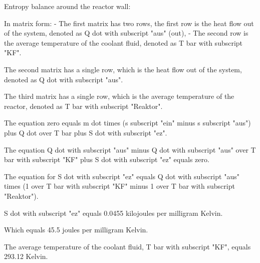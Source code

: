 Entropy balance around the reactor wall:

In matrix form:
- The first matrix has two rows, the first row is the heat flow out of the system, denoted as Q dot with subscript "aus" (out),
- The second row is the average temperature of the coolant fluid, denoted as T bar with subscript "KF".

The second matrix has a single row, which is the heat flow out of the system, denoted as Q dot with subscript "aus".

The third matrix has a single row, which is the average temperature of the reactor, denoted as T bar with subscript "Reaktor".

The equation zero equals m dot times (s subscript "ein" minus s subscript "aus") plus Q dot over T bar plus S dot with subscript "ez".

The equation Q dot with subscript "aus" minus Q dot with subscript "aus" over T bar with subscript "KF" plus S dot with subscript "ez" equals zero.

The equation for S dot with subscript "ez" equals Q dot with subscript "aus" times (1 over T bar with subscript "KF" minus 1 over T bar with subscript "Reaktor").

S dot with subscript "ez" equals 0.0455 kilojoules per milligram Kelvin.

Which equals 45.5 joules per milligram Kelvin.

The average temperature of the coolant fluid, T bar with subscript "KF", equals 293.12 Kelvin.
